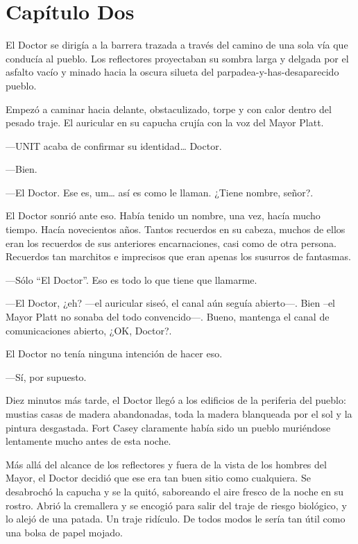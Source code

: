 \chapter*{Capítulo Dos}

El Doctor se dirigía a la barrera trazada a través del camino de una 
sola vía que conducía al pueblo. Los reflectores proyectaban su sombra
larga y delgada por el asfalto vacío y minado hacia la oscura silueta
del parpadea-y-has-desaparecido pueblo.

Empezó a caminar hacia delante, obstaculizado, torpe y con calor dentro
del pesado traje. El auricular en su capucha crujía con la voz del Mayor
Platt.

---UNIT acaba de confirmar su identidad\ldots{} Doctor.

---Bien.

---El Doctor. Ese es, um\ldots{} así es como le llaman. ¿Tiene nombre,
señor?.

El Doctor sonrió ante eso. Había tenido un nombre, una vez, hacía mucho
tiempo. Hacía novecientos años. Tantos recuerdos en su cabeza, muchos de
ellos eran los recuerdos de sus anteriores encarnaciones, casi como de
otra persona. Recuerdos tan marchitos e imprecisos que eran apenas los
susurros de fantasmas.

---Sólo ``El Doctor''. Eso es todo lo que tiene que llamarme.

---El Doctor, ¿eh? ---el auricular siseó, el canal aún seguía
abierto---. Bien --el Mayor Platt no sonaba del todo convencido---.
Bueno, mantenga el canal de comunicaciones abierto, ¿OK, Doctor?.

El Doctor no tenía ninguna intención de hacer eso.

---Sí, por supuesto.

Diez minutos más tarde, el Doctor llegó a los edificios de la periferia
del pueblo: mustias casas de madera abandonadas, toda la madera
blanqueada por el sol y la pintura desgastada. Fort Casey claramente
había sido un pueblo muriéndose lentamente mucho antes de esta noche.

Más allá del alcance de los reflectores y fuera de la vista de los
hombres del Mayor, el Doctor decidió que ese era tan buen sitio como
cualquiera. Se desabrochó la capucha y se la quitó, saboreando el aire
fresco de la noche en su rostro. Abrió la cremallera y se encogió para
salir del traje de riesgo biológico, y lo alejó de una patada. Un traje
ridículo. De todos modos le sería tan útil como una bolsa de papel
mojado.

